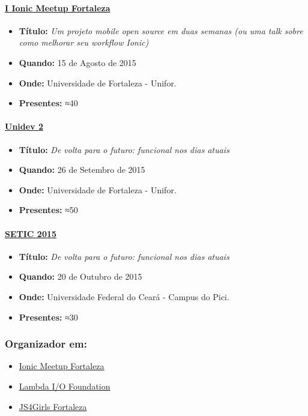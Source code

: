 \documentclass[]{article}
\providecommand{\tightlist}{%
  \setlength{\itemsep}{0pt}\setlength{\parskip}{0pt}}
\let\oldparagraph\paragraph
\renewcommand{\paragraph}[1]{\oldparagraph{#1}\mbox{}}
\begin{document}
\paragraph{\texorpdfstring{\href{http://www.meetup.com/pt/Ionic-Ceara/events/224620543/}{I
Ionic Meetup
Fortaleza}}{I Ionic Meetup Fortaleza}}\label{i-ionic-meetup-fortaleza}

\begin{itemize}
\tightlist
\item
  \textbf{Título:} \emph{Um projeto mobile open source em duas semanas
  (ou uma talk sobre como melhorar seu workflow Ionic)}
\item
  \textbf{Quando:} 15 de Agosto de 2015
\item
  \textbf{Onde:} Universidade de Fortaleza - Unifor.
\item
  \textbf{Presentes:} ≈40
\end{itemize}

\paragraph{\texorpdfstring{\href{http://unidevce.github.io/}{Unidev
2}}{Unidev 2}}\label{unidev-2}

\begin{itemize}
\tightlist
\item
  \textbf{Título:} \emph{De volta para o futuro: funcional nos dias
  atuais}
\item
  \textbf{Quando:} 26 de Setembro de 2015
\item
  \textbf{Onde:} Universidade de Fortaleza - Unifor.
\item
  \textbf{Presentes:} ≈50
\end{itemize}

\paragraph{\texorpdfstring{\href{http://www.seti.ufc.br/}{SETIC
2015}}{SETIC 2015}}\label{setic-2015}

\begin{itemize}
\tightlist
\item
  \textbf{Título:} \emph{De volta para o futuro: funcional nos dias
  atuais}
\item
  \textbf{Quando:} 20 de Outubro de 2015
\item
  \textbf{Onde:} Universidade Federal do Ceará - Campus do Pici.
\item
  \textbf{Presentes:} ≈30
\end{itemize}

\subsubsection{Organizador em:}\label{organizador-em}

\begin{itemize}
\tightlist
\item
  \href{http://ionicbrazil.com/}{Ionic Meetup Fortaleza}
\item
  \href{https://github.com/lambda-io}{Lambda I/O Foundation}
\item
  \href{http://js4girls-fortaleza.github.io/}{JS4Girls Fortaleza}
\end{itemize}
\end{document}
